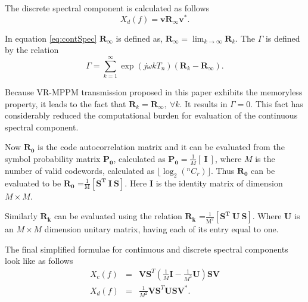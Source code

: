 The discrete spectral component is calculated as follows
\begin{equation} 
\label{eq:discSpec} 
X_d(f) = \mathbf{v} \mathbf{R}_{\infty} \mathbf{v}^*. 
\end{equation}


In equation \ref{eq:contSpec}  $\mathbf{R}_{\infty}$ is defined as, $\mathbf{R}_{\infty} = \lim_{k \rightarrow \infty} \mathbf{R}_{k}$. The $\Gamma$ is defined by the relation 
\begin{equation}
    \Gamma = \sum_{k=1}^{\infty} \exp(j \omega k T_n) (\mathbf{R}_k - \mathbf{R}_{\infty}).
\end{equation}

Because VR-MPPM transmission proposed in this paper exhibits the memoryless property, it leads to the fact that $\mathbf{R}_k = \mathbf{R}_{\infty},~\forall k$. It results in $\Gamma =0$. This fact has considerably reduced the computational burden for evaluation of the continuous spectral component. 

Now $\mathbf{R_0}$ is the code autocorrelation matrix and it can be evaluated from the symbol probability matrix $\mathbf{P_0}$, calculated as $\mathbf{P_0}=\frac{1}{M}\left[~\mathbf{I}~\right]$, where $M$ is the number of valid codewords, calculated as ${\lfloor \log_{2}(^nC_r) \rfloor}$. Thus $\mathbf{R_0}$ can be evaluated to be $\mathbf{R_0}$ =$\frac{1}{\text{M}} \left[\mathbf{S^T~I~S}\right]$. Here $\mathbf{I}$ is the identity matrix of dimension $M \times M$.

Similarly $\mathbf{R_k}$ can be evaluated using the relation $\mathbf{R_k}$ =$\frac{1}{\text{M}^2}\left[\mathbf{S^T~U~S}\right]$. Where $\mathbf{U}$ is an $M \times M$ dimension unitary matrix, having each of its entry equal to one.

The final simplified formulae for continuous and discrete spectral components look like as follows
\begin{eqnarray} 
	\label{eq:spectrum_cont}
	    X_c(f) &=& \mathbf{VS}^T \left(\frac{1}{M}\mathbf{I} - \frac{1}{M^2}\mathbf{U} \right) \mathbf{SV} \\
	\label{eq:spectrum_disc} 
		X_d(f) &=& \frac{1}{M^2} \mathbf{VS}^T \mathbf{U} \mathbf{SV}^*. 
\end{eqnarray}

